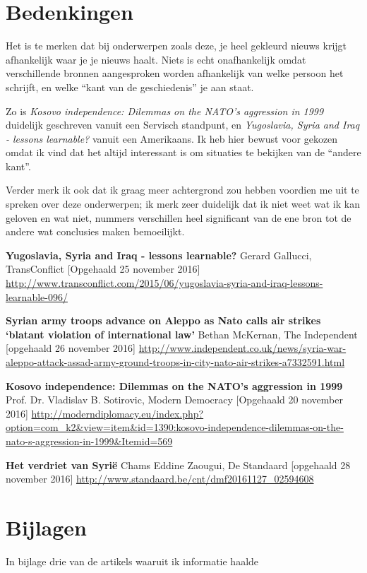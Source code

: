 \documentclass[a4paper]{article}
\begin{document}

\section{Bedenkingen} %
\label{sec:bedenkingen}

Het is te merken dat bij onderwerpen zoals deze, je heel gekleurd nieuws krijgt afhankelijk waar je je nieuws haalt. Niets is echt onafhankelijk omdat verschillende bronnen aangesproken worden afhankelijk van welke persoon het schrijft, en welke ``kant van de geschiedenis'' je aan staat.

Zo is \emph{Kosovo independence: Dilemmas on the NATO’s aggression in 1999} \cite{kosovo} duidelijk geschreven vanuit een Servisch standpunt, en \emph{Yugoslavia, Syria and Iraq - lessons learnable?} \cite{transconflict} vanuit een Amerikaans. Ik heb hier bewust voor gekozen omdat ik vind dat het altijd interessant is om situaties te bekijken van de ``andere kant''.

Verder merk ik ook dat ik graag meer achtergrond zou hebben voordien me uit te spreken over deze onderwerpen; ik merk zeer duidelijk dat ik niet weet wat ik kan geloven en wat niet, nummers verschillen heel significant van de ene bron tot de andere wat conclusies maken bemoeilijkt.


\begin{raggedright}
  \begin{thebibliography}{9}

    \textbf{Yugoslavia, Syria and Iraq - lessons learnable?}
    Gerard Gallucci,
    TransConflict
    [Opgehaald 25 november 2016]
    \url{http://www.transconflict.com/2015/06/yugoslavia-syria-and-iraq-lessons-learnable-096/}

    \textbf{Syrian army troops advance on Aleppo as Nato calls air strikes `blatant violation of international law'}
    Bethan McKernan,
    The Independent
    [opgehaald 26 november 2016]
    \url{http://www.independent.co.uk/news/syria-war-aleppo-attack-assad-army-ground-troops-in-city-nato-air-strikes-a7332591.html}

    \textbf{Kosovo independence: Dilemmas on the NATO’s aggression in 1999}
    Prof. Dr. Vladislav B. Sotirovic,
    Modern Democracy
    [Opgehaald 20 november 2016]
    \url{http://moderndiplomacy.eu/index.php?option=com_k2&view=item&id=1390:kosovo-independence-dilemmas-on-the-nato-s-aggression-in-1999&Itemid=569}

    \textbf{Het verdriet van Syrië}
    Chams Eddine Zaougui,
    De Standaard
    [opgehaald 28 november 2016]
    \url{http://www.standaard.be/cnt/dmf20161127_02594608}
  \end{thebibliography}
\end{raggedright}

\section{Bijlagen} %
\label{sec:bijlagen}

In bijlage drie van de artikels waaruit ik informatie haalde






\end{document}
